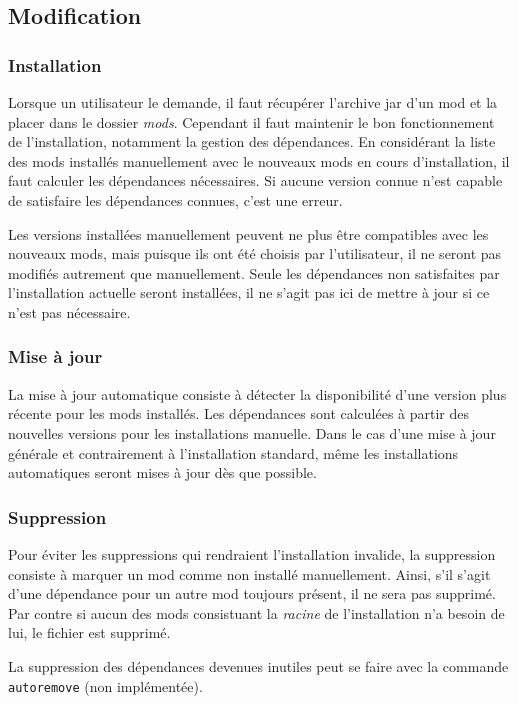 \documentclass{article}
\begin{document}
\subsection{Modification}
\subsubsection{Installation}
Lorsque un utilisateur le demande, il faut récupérer l'archive jar d'un mod et la placer dans le dossier \textit{mods}.
Cependant il faut maintenir le bon fonctionnement de l'installation, notamment la gestion des dépendances.
En considérant la liste des mods installés manuellement avec le nouveaux mods en cours d'installation, il faut calculer les dépendances nécessaires.
Si aucune version connue n'est capable de satisfaire les dépendances connues, c'est une erreur.

Les versions installées manuellement peuvent ne plus être compatibles avec les nouveaux mods, mais puisque ils ont été choisis par l'utilisateur, il ne seront pas modifiés autrement que manuellement.
Seule les dépendances non satisfaites par l'installation actuelle seront installées, il ne s'agit pas ici de mettre à jour si ce n'est pas nécessaire.


\subsubsection{Mise à jour}
La mise à jour automatique consiste à détecter la disponibilité d'une version plus récente pour les mods installés.
Les dépendances sont calculées à partir des nouvelles versions pour les installations manuelle.
Dans le cas d'une mise à jour générale et contrairement à l'installation standard, même les installations automatiques seront mises à jour dès que possible.

\subsubsection{Suppression}
Pour éviter les suppressions qui rendraient l'installation invalide, la suppression consiste à marquer un mod comme non installé manuellement.
Ainsi, s'il s'agit d'une dépendance pour un autre mod toujours présent, il ne sera pas supprimé.
Par contre si aucun des mods consistuant la \textit{racine} de l'installation n'a besoin de lui, le fichier est supprimé.

La suppression des dépendances devenues inutiles peut se faire avec la commande \texttt{autoremove} (non implémentée).
\end{document}
